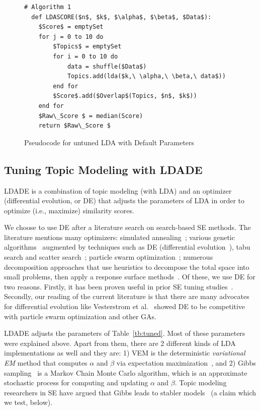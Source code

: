 \documentclass[twocolumn,5p,sort&compress]{elsarticle}
\theoremstyle{break}
\begin{document}
\begin{figure}[!h]
\begin{lstlisting}[mathescape,linewidth=8.2cm,frame=r,numbers=right]
  # Algorithm 1
  def LDASCORE($n$, $k$, $\alpha$, $\beta$, $Data$):
    $Score$ = emptySet
    for j = 0 to 10 do
        $Topics$ = emptySet
        for i = 0 to 10 do
            data = shuffle($Data$)
            Topics.add(lda($k,\ \alpha,\ \beta,\ data$))
        end for
        $Score$.add($Overlap$(Topics, $n$, $k$))
    end for
    $Raw\_Score $ = median(Score)
    return $Raw\_Score $
\end{lstlisting}
\caption{Pseudocode for untuned LDA with Default Parameters}
\label{fig:pseudo_un}  
\end{figure}

\subsection{Tuning Topic Modeling with LDADE}
\label{sect:tuning}
LDADE is a combination of topic modeling (with LDA) and an optimizer (differential evolution, or DE) that adjusts
the parameters of LDA in order to optimize (i.e., maximize) similarity scores.

We choose to use DE after a literature search on search-based SE methods.
The literature mentions many optimizers: simulated
annealing~\cite{feather2002converging, menzies2007business}; various genetic
algorithms~\cite{goldberg1979complexity} augmented by techniques such as
DE (differential evolution~\cite{storn1997differential}), tabu search and scatter
search~\cite{glover1986general, beausoleil2006moss, molina2007sspmo,nebro2008abyss}; particle swarm optimization~\cite{pan2008particle}; numerous
decomposition approaches that use heuristics to decompose the total space into
small problems, then apply a response surface methods~\cite{krall2015gale, zuluaga2013active}.
Of these, we use DE for two reasons. Firstly, it has been proven useful in prior SE tuning
studies~\cite{fu2016tuning}. Secondly, our reading of the current literature is
that there are many advocates for differential evolution like Vesterstrom et al.~\cite{vesterstrom2004comparative} showed DE to be
competitive with particle swarm optimization and other GAs. 

LDADE  adjusts the parameters of
Table~\ref{tb:tuned}. Most of these parameters were explained above. Apart from them, there are 2 different kinds of LDA implementations as well and they are: 1) VEM is the deterministic {\em variational EM} method that computes $\alpha$ and $\beta$ via
  expectation maximization~\cite{minka2002expectation}, and 2) Gibbs sampling~\cite{wei2006lda, griffiths2004finding} is a Markov Chain Monte Carlo algorithm, which is an approximate stochastic process for computing and updating $\alpha$ and $\beta$.
  Topic modeling researchers in SE have argued that Gibbs leads to stabler models~\cite{layman16a,layman2016topic} (a claim which we test, below).
\end{document}
